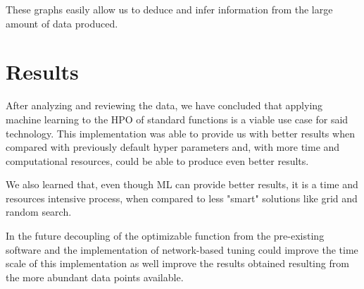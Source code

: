 \documentclass[runningheads]{llncs}
\begin{document}
These graphs easily allow us to deduce and infer information from the large amount of data produced.

\section{Results}

After analyzing and reviewing the data, we have concluded that applying machine learning to the HPO of standard functions is a viable use case for said technology. This implementation was able to provide us with better results when compared with previously default hyper parameters and, with more time and computational resources, could be able to produce even better results.

We also learned that, even though ML can provide better results, it is a time and resources intensive process, when compared to less "smart" solutions like grid and random search.

In the future decoupling of the optimizable function from the pre-existing software and the implementation of network-based tuning could improve the time scale of this implementation as well improve the results obtained resulting from the more abundant data points available.



\end{document}
